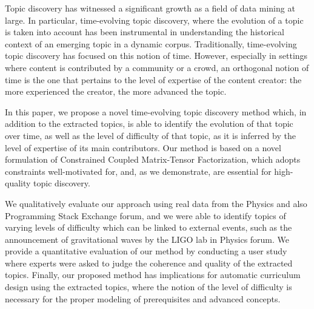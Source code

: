 Topic discovery has witnessed a significant growth as a field of data mining at large. In particular, time-evolving topic discovery, where the evolution of a topic is taken into account has been instrumental in understanding the historical context of an emerging topic in a dynamic corpus. Traditionally, time-evolving topic discovery has focused on this notion of time. However, especially in settings where content is contributed by a community or a crowd, an orthogonal notion of time is the one that pertains to the level of expertise of the content creator: the more experienced the creator, the more advanced the topic. 

In this paper, we propose a novel time-evolving topic discovery method which, in addition to the extracted topics, is able to identify the evolution of that topic over time, as well as the level of difficulty of that topic, as it is inferred by the level of expertise of its main contributors. Our method is based on a novel formulation of  Constrained Coupled Matrix-Tensor Factorization, which adopts constraints well-motivated for, and, as we demonstrate, are essential for high-quality topic discovery.  

We qualitatively evaluate our approach using real data from the Physics and also Programming Stack Exchange forum, and we were able to identify topics of varying levels of difficulty which can be linked to external events, such as the announcement of gravitational waves by the LIGO lab in Physics forum. We provide a quantitative evaluation of our method by conducting a user study where experts were asked to judge the coherence and quality of the extracted topics. 
Finally, our proposed method has implications for automatic curriculum design using the extracted topics, where the notion of the level of difficulty is necessary for the proper modeling of prerequisites and advanced concepts. 
